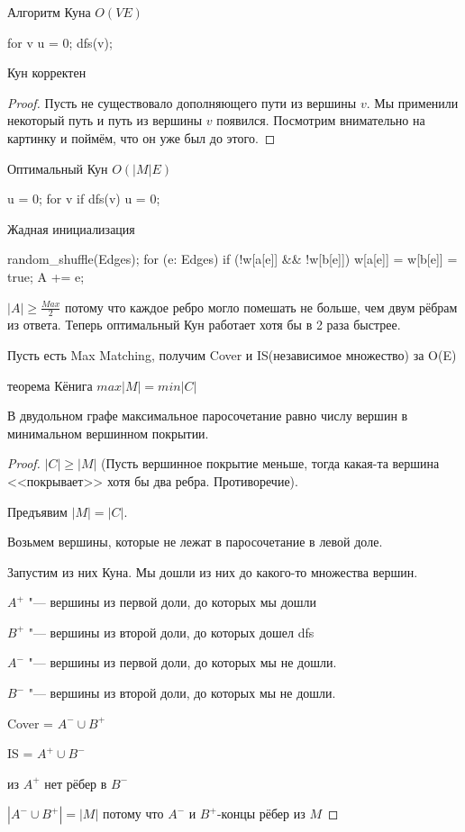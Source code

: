 Алгоритм Куна $O(VE)$
\begin{cppcode}
for v {
	u = 0;
	dfs(v);
}
\end{cppcode}
\begin{theorem}
Кун корректен
\end{theorem}
\begin{proof}
Пусть не существовало дополняющего пути из вершины $v$. Мы применили некоторый путь и путь из вершины $v$ появился. Посмотрим внимательно на картинку и поймём, что он уже был до этого.
\end{proof}
Оптимальный Кун $O(|M|E)$
\begin{cppcode}
u = {0};
for v {
	if dfs(v) {
		u = {0};
	}
}
\end{cppcode}
Жадная инициализация
\begin{cppcode}
random_shuffle(Edges);
for (e: Edges) {
	if (!w[a[e]] && !w[b[e]]) {
		w[a[e]] = w[b[e]] = true;
		A += {e};
	}
}
\end{cppcode}
$|A| \ge \frac{Max}{2}$ потому что каждое ребро могло помешать не больше, чем двум рёбрам из ответа. Теперь оптимальный Кун работает хотя бы в 2 раза быстрее.

Пусть есть Max Matching, получим Cover и IS(независимое множество) за O(E)
\begin{theorem}{теорема Кёнига}
$max |M| = min |C|$

В двудольном графе максимальное паросочетание равно числу вершин в минимальном вершинном покрытии.
\end{theorem}
\begin{proof}
$|C| \ge |M|$ (Пусть вершинное покрытие меньше, тогда какая-та вершина <<покрывает>> хотя бы два ребра. Противоречие).

Предъявим $|M| = |C|$.

Возьмем вершины, которые не лежат в паросочетание в левой доле.

Запустим из них Куна. Мы дошли из них до какого-то множества вершин. 

$A^+$ "--- вершины из первой доли, до которых мы дошли

$B^+$ "--- вершины из второй доли, до которых дошел dfs

$A^-$ "--- вершины из первой доли, до которых мы не дошли.
 
$B^-$ "--- вершины из второй доли, до которых мы не дошли. 

Cover = $A^- \cup B^+$

IS = $A^+ \cup B^-$
\item из $A^+$ нет рёбер в $B^-$
\item $|A^- \cup B^+| = |M|$ потому что $A^-$ и $B^+$-концы рёбер из $M$
\end{proof}

